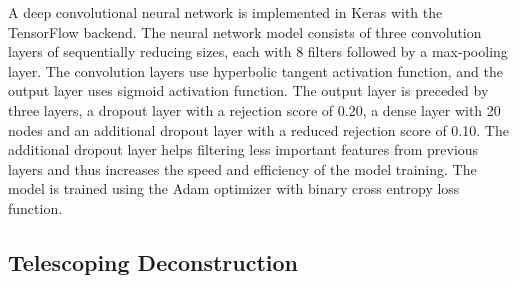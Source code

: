 \documentclass[notoc,preprintnumbers]{JHEP3}
\begin{document}
A deep convolutional neural network is implemented in Keras with the TensorFlow \cite{DBLP:journals/corr/AbadiBCCDDDGIIK16} backend. The neural network model consists of three convolution layers of sequentially reducing sizes, each with 8 filters followed by a max-pooling layer. The convolution layers use hyperbolic tangent activation function, and the output layer uses sigmoid activation function. The output layer is preceded by three layers, a dropout layer with a rejection score of 0.20, a dense layer with 20 nodes and an additional dropout layer with a reduced rejection score of 0.10. The additional dropout layer helps filtering less important features from previous layers and thus increases the speed and efficiency of the model training. The model is trained using the Adam optimizer with binary cross entropy loss function.
	
\subsection{Telescoping Deconstruction}
\label{sec:tjet}
\end{document}
